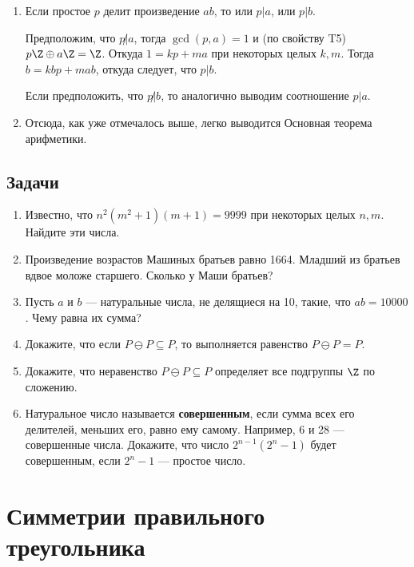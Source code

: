\begin{enumerate}[T1]
\item Если простое $p$ делит произведение $ab$, то или $p|a$, или $p|b$.

Предположим, что $p\not|a$, тогда $\gcd(p,a)=1$ и (по свойству T5) $p\Z\oplus a\Z=\Z$. Откуда $1=kp+ma$ при некоторых целых $k,m$. Тогда $b=kbp+mab$, откуда следует, что $p|b$.

Если предположить, что $p\not|b$, то аналогично выводим соотношение $p|a$.
\item Отсюда, как уже отмечалось выше, легко выводится Основная теорема арифметики.
\end{enumerate}


\subsection*{Задачи}
\begin{enumerate}
\item Известно, что $n^2(m^2+1)(m+1)=9999$ при некоторых целых $n,m$. Найдите эти числа.
\item Произведение возрастов Машиных братьев равно 1664. Младший из братьев вдвое моложе старшего. Сколько у Маши братьев?
\item Пусть $a$ и $b$ --- натуральные числа, не делящиеся на 10, такие, что $ab=10000$. Чему равна их сумма?
\item Докажите, что если $P\ominus P\subseteq P$, то выполняется равенство $P\ominus P=P$.
\item Докажите, что неравенство $P\ominus P\subseteq P$ определяет все подгруппы $\Z$ по сложению.
\item Натуральное число называется \textbf{совершенным}, если сумма всех его делителей, меньших его, равно ему самому. Например, 6 и 28 --- совершенные числа. Докажите, что число $2^{n-1}(2^n-1)$ будет совершенным, если $2^n-1$ --- простое число.
\end{enumerate}





\section{Симметрии правильного треугольника}

